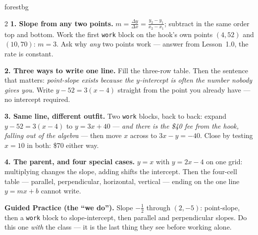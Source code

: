 \documentclass[10pt]{article}
\begin{document}
\begin{skillbox}{forestbg}
\begin{multicols}{2}
\textbf{1. Slope from any two points.} $m=\frac{\Delta y}{\Delta x}=\frac{y_2-y_1}{x_2-x_1}$;
subtract in the same order top and bottom. Work the first \texttt{work} block on the hook's own
points $(4,52)$ and $(10,70)$: $m=3$. Ask why \emph{any} two points work --- answer from Lesson~1.0,
the rate is constant.

\textbf{2. Three ways to write one line.} Fill the three-row table. Then the sentence that matters:
\emph{point-slope exists because the $y$-intercept is often the number nobody gives you.} Write
$y-52=3(x-4)$ straight from the point you already have --- no intercept required.

\columnbreak
\textbf{3. Same line, different outfit.} Two \texttt{work} blocks, back to back: expand
$y-52=3(x-4)$ to $y=3x+40$ --- \emph{and there is the \$40 fee from the hook, falling out of the
algebra} --- then move $x$ across to $3x-y=-40$. Close by testing $x=10$ in both: \$70 either way.

\textbf{4. The parent, and four special cases.} $y=x$ with $y=2x-4$ on one grid: multiplying changes
the slope, adding shifts the intercept. Then the four-cell table --- parallel, perpendicular,
horizontal, vertical --- ending on the one line $y=mx+b$ cannot write.

\textbf{Guided Practice (the ``we do'').} Slope $-\tfrac12$ through $(2,-5)$: point-slope, then a
\texttt{work} block to slope-intercept, then parallel and perpendicular slopes. Do this one
\emph{with} the class --- it is the last thing they see before working alone.
\end{multicols}
\end{skillbox}
\end{document}
